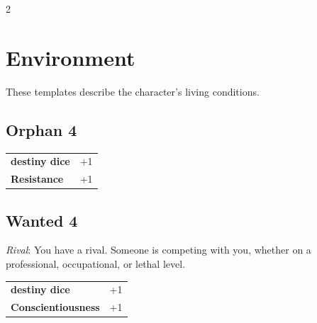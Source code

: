 \begin{multicols}{2}
\begin{tcolorbox}
\end{tcolorbox}

\section{Environment}

These templates describe the character's living conditions.

\begin{tcolorbox}
    \subsection*{Orphan \hfill \small{4 }}
    \tcblower




\begin{tabular}{@{}ll@{}}
    \textbf{destiny dice} & +1\\
    \textbf{Resistance} & +1\\
\end{tabular}


\end{tcolorbox}

\begin{tcolorbox}
    \subsection*{Wanted \hfill \small{4 }}
    \tcblower
\textit{Rival}: You have a rival. Someone is competing with you, whether on a professional, occupational, or lethal level.


\vspace{3mm}

\begin{tabular}{@{}ll@{}}
    \textbf{destiny dice} & +1\\
    \textbf{Conscientiousness} & +1\\
\end{tabular}


\end{tcolorbox}

\begin{tcolorbox}

\end{tcolorbox}
\end{multicols}

